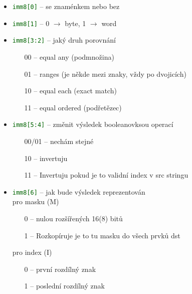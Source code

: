 \documentclass[
]{cz_sablona}
\newcommand{\const}[1]{\texttt{\textcolor{darkgreen}{#1}}}
\begin{document}
\begin{itemize}
    \item \const{imm8[0]} -- se znaménkem nebo bez
    \item \const{imm8[1]} -- 0 $\rightarrow$ byte, 1 $\rightarrow$ word
    \item \const{imm8[3:2]} -- jaký druh porovnání
        \begin{itemize} 
            \item[00] -- equal any (podmnožina)
            \item[01] -- ranges (je někde mezi znaky, vždy po dvojicích)
            \item[10] -- equal each (exact match)
            \item[11] -- equal ordered (podřetězec)
        \end{itemize}
    \item \const{imm8[5:4]} -- změnit výsledek booleanovksou operací
        \begin{itemize}
            \item[00/01] -- nechám stejné
            \item[10] -- invertuju
            \item[11] -- Invertuju pokud je to validní index v src stringu
        \end{itemize}
    \item \const{imm8[6]} -- jak bude výsledek reprezentován\\
        pro masku (M)
        \begin{itemize}
            \item[0] -- nulou rozšířených 16(8) bitů
            \item[1] -- Rozkopíruje je to tu masku do všech prvků dst
        \end{itemize}
        pro index (I)
        \begin{itemize}
            \item[0] -- první rozdílný znak
            \item[1] -- poslední rozdílný znak
        \end{itemize}
\end{itemize}
\end{document}
